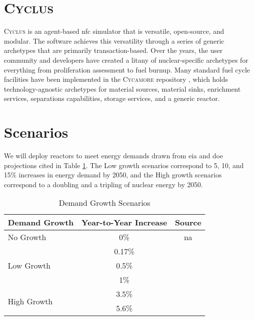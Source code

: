 \documentclass{anstrans}
\newcommand{\cycamore}{\textsc{Cycamore}\xspace}
\newcommand{\cyclus}{\textsc{Cyclus}\xspace}
\begin{document}
\section{\cyclus}

\cyclus \cite{huff_cyclus_intro_2016} is an agent-based \gls{nfc} simulator
that is versatile, open-source, and modular. The software achieves this
versatility through a series of generic archetypes that are primarily
transaction-based. Over the years, the user community and developers have
created a litany of nuclear-specific archetypes for everything from
proliferation assessment to fuel burnup. Many standard fuel cycle facilities
have been implemented in the \cycamore repository \cite{Carlsen_cycamore_2014},
which holds technology-agnostic archetypes for material sources, material
sinks, enrichment services, separations capabilities, storage services, and a
generic reactor.


\section{Scenarios}
We will deploy reactors to meet energy demands drawn from \gls{eia} and \gls{doe} projections cited in Table \ref{tab:demand_scenarios}. The Low growth scenarios correspond to 5, 10, and 15\% increases in energy demand by 2050, and the High growth scenarios correspond to a doubling and a tripling of nuclear energy by 2050.

\begin{table}[h]
  \centering
  \caption{Demand Growth Scenarios}
  \label{tab:demand_scenarios}
  \begin{tabular}{l c c}
      \hline
      \textbf{Demand Growth} & \textbf{Year-to-Year Increase} & \textbf{Source}\\
      \hline
      No Growth & 0\% & na\\
      \multirow{3}{*}{Low Growth} & 0.17\% & \cite{eia_aeo_2023}\\
       & 0.5\% & \cite{eia_aeo_2023}\\
       & 1\% & \cite{eia_aeo_2023}\\
       \multirow{2}{*}{High Growth} & 3.5\% & \cite{julie_liftoff_pathways_2024} \\
       & 5.6\% & \cite{julie_liftoff_pathways_2024}\\
      \hline
  \end{tabular}
\end{table}
\end{document}
